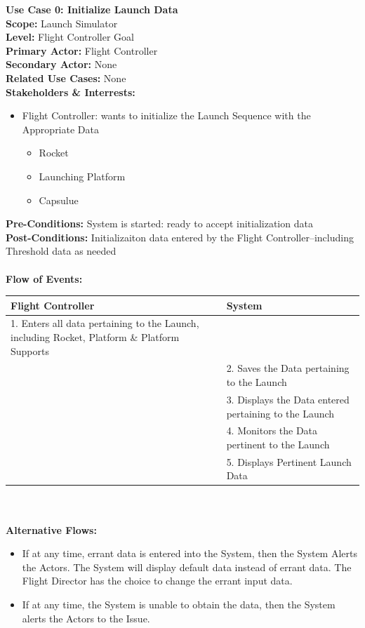 \documentclass[letterpaper]{article}
\begin{document}
\noindent
\textbf{Use Case 0: Initialize Launch Data}\\
\textbf{Scope:  }Launch Simulator\\
\textbf{Level:  }Flight Controller Goal\\
\textbf{Primary Actor:  }Flight Controller\\
\textbf{Secondary Actor:  }None\\
\textbf{Related Use Cases:  }None\\
\textbf{Stakeholders \& Interrests:}
\begin{itemize}
   \item Flight Controller:  wants to initialize the Launch Sequence
      with the Appropriate Data
      \begin{itemize}
         \item Rocket 
         \item Launching Platform 
         \item Capsulue
      \end{itemize}
\end{itemize}
\textbf{Pre-Conditions:  }System is started:  ready to accept
initialization data\\
\textbf{Post-Conditions:  }Initializaiton data entered by the Flight
Controller--including Threshold data as needed\\\\
\textbf{Flow of Events: }\\
\begin{tabular}{|p{5.75cm}|p{5.75cm}|}\hline
\textbf{Flight Controller}&\textbf{System}\\\hline
1. Enters all data pertaining to the Launch, including
   Rocket, Platform \& Platform Supports &\\\hline
& 2. Saves the Data pertaining to the Launch\\\hline
& 3. Displays the Data entered pertaining to the Launch\\\hline
& 4. Monitors the Data pertinent to the Launch\\\hline
& 5. Displays Pertinent Launch Data\\\hline
\end{tabular}\\\\
\textbf{Alternative Flows:}
\begin{itemize}
\item[1a.]If at any time, errant data is entered into the System,
then the System Alerts the Actors. The System will display
default data instead of errant data.  The Flight Director has the
choice to change the errant input data.
\item[1b.] If at any time, the System is unable to obtain the data,
then the System alerts the Actors to the Issue.
\end{itemize}
\end{document}
